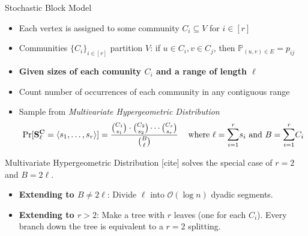 \begin{block}{Stochastic Block Model}%

\begin{itemize}
    \item Each vertex is assigned to some community $C_i\subseteq V$ for $i\in [r]$
    \item Communities $\{C_i\}_{i\in [r]}$ partition $V$:
          if $u\in C_i, v\in C_j$, then $\mathbb P_{(u, v)\in E} = p_{ij}$
\end{itemize}
\begin{itemize}
\item [] \textbf{Given sizes of each comunity $C_i$ and a range of length $\ell$}
    \item Count number of occurrences of each community in any contiguous range%
    \item Sample from \emph{Multivariate Hypergeometric Distribution}%
\[
\Pr[\mathbf{S}^\mathbf{C}_\ell = \langle s_1, \ldots, s_r \rangle]
= \frac{\binom{C_1}{s_1}\cdot\binom{C_2}{s_2}\cdots\binom{C_r}{s_r}}{\binom{B}{\ell}}
\hspace{2ex}\textrm{ where } \ell = \mathlarger{\sum}^{r}_{i=1} s_i
\textrm{ and } B = \mathlarger{\sum}^{r}_{i=1} C_i
\]
\end{itemize}


\begin{alertblock}{Multivariate Hypergeometric Distribution}
[cite] solves the special case of $r=2$ and $B = 2\ell$.
\begin{itemize}
    \item \textbf{Extending to $B\not= 2\ell$}: Divide $\ell$ into $\mathcal O(\log n)$ dyadic segments.
    \item \textbf{Extending to $r>2$}: Make a tree with $r$ leaves (one for each $C_i$).
          Every branch down the tree is equivalent to a $r=2$ splitting.
\end{itemize}
\end{alertblock}

\end{block}
